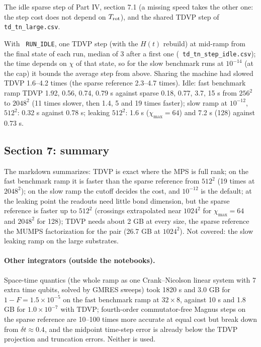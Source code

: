 \documentclass[11pt]{article}
\renewenvironment{function}[1]{\par\Needspace{7\baselineskip}\medskip\noindent{\raggedright\textbf{\large\texttt{\hyphenchar\font=-1 #1}}\par}\nopagebreak}{\par\medskip}
\renewcommand{\code}[1]{\texttt{\hyphenchar\font=-1 #1}}
\begin{document}
\begin{function}{sparse\_idle(pt, L, rot), shared\_tdvp(pt, L, rot, m, c)}
The idle sparse step of Part IV, section 7.1 (a missing speed takes the other one: the step cost does not depend on $T_{\rm rot}$), and the shared
TDVP step of \code{td\_tn\_large.csv}.
\end{function}
With \code{RUN\_IDLE}, one TDVP step (with the $H(t)$ rebuild) at mid-ramp from the final state of each run, median of 3 after a first one
(\code{td\_tn\_step\_idle.csv}); the time depends on $\chi$ of that state, so for the slow benchmark runs at $10^{-14}$ (at the cap) it bounds the average
step from above. Sharing the machine had slowed TDVP 1.6--4.2 times (the sparse reference 2.3--4.7 times). Idle: fast benchmark ramp TDVP 1.92, 0.56, 0.74, 0.79 s against sparse 0.18, 0.77,
3.7, 15 s from $256^2$ to $2048^2$ (11 times slower, then 1.4, 5 and 19 times faster); slow ramp at $10^{-12}$, $512^2$: 0.32 s against 0.78 s; leaking
$512^2$: 1.6 s ($\chi_{\max} = 64$) and 7.2 s (128) against 0.73 s.

\subsection{Section 7: summary}
The markdown summarizes: TDVP is exact where the MPS is full rank; on the fast benchmark ramp it is faster than the sparse reference from
$512^2$ (19 times at $2048^2$); on the slow ramp the cutoff decides the cost, and $10^{-12}$ is the default; at the leaking point the readouts need little
bond dimension, but the sparse reference is faster up to $512^2$ (crossings extrapolated near $1024^2$ for $\chi_{\max} = 64$ and $2048^2$ for 128); TDVP needs
about 2 GB at every size, the sparse reference the MUMPS factorization for the pair (26.7 GB at $1024^2$). Not covered: the slow leaking ramp on the
large substrates.

\paragraph{Other integrators (outside the notebooks).} Space-time quantics (the whole ramp as one Crank--Nicolson linear system with 7 extra time
qubits, solved by GMRES sweeps) took 1820 s and 3.0 GB for $1-F = 1.5\times10^{-5}$ on the fast benchmark ramp at $32\times8$, against 10 s and 1.8 GB for
$1.0\times10^{-7}$ with TDVP; fourth-order commutator-free Magnus steps on the sparse reference are 10--100 times more accurate at equal cost but break
down from $\delta t\approx0.4$, and the midpoint time-step error is already below the TDVP projection and truncation errors. Neither is used.
\end{document}
